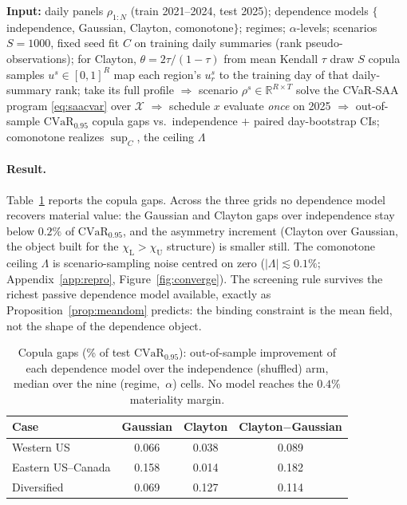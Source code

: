 \documentclass[10pt,twocolumn]{article}
\newcommand{\CVaR}{\mathrm{CVaR}}
\newcommand{\R}{\mathbb{R}}
\newcommand{\chiU}{\chi_{\mathrm{U}}}
\newcommand{\chiL}{\chi_{\mathrm{L}}}
\begin{document}
\begin{algorithm}[h]
\caption{Copula-scenario CVaR scheduling (one region set)}
\label{alg:copula}
\begin{algorithmic}[1]
\State \textbf{Input:} daily panels $\rho_{1:N}$ (train 2021--2024, test 2025);
dependence models $\{$independence, Gaussian, Clayton, comonotone$\}$; regimes;
$\alpha$-levels; scenarios $S=1000$, fixed seed
  \State fit $C$ on training daily summaries (rank pseudo-observations); for Clayton,
  $\theta=2\tau/(1-\tau)$ from mean Kendall $\tau$
    \State draw $S$ copula samples $u^s\in[0,1]^R$ 
    \State map each region's $u^s_r$ to the training day of that daily-summary rank;
    take its full profile $\Rightarrow$ scenario $\rho^s\in\R^{R\times T}$
    \State solve the CVaR-SAA program \eqref{eq:saacvar} over $\mathcal X$
    $\Rightarrow$ schedule $x$
    \State evaluate \emph{once} on 2025 $\Rightarrow$ out-of-sample $\CVaR_{0.95}$
  \EndFor
\EndFor
\State copula gaps vs.\ independence $+$ paired day-bootstrap CIs; comonotone
realizes $\sup_C$, the ceiling $\Lambda$
\end{algorithmic}
\end{algorithm}

\paragraph{Result.} Table~\ref{tab:copula} reports the copula gaps. Across the three
grids no dependence model recovers material value: the Gaussian and Clayton gaps over
independence stay below $0.2\%$ of $\CVaR_{0.95}$, and the asymmetry increment
(Clayton over Gaussian, the object built for the $\chiL>\chiU$ structure) is smaller
still. The comonotone ceiling $\Lambda$ is scenario-sampling noise centred on zero
($|\Lambda|\lesssim0.1\%$; Appendix~\ref{app:repro}, Figure~\ref{fig:converge}). The
screening rule survives the richest passive dependence model available, exactly as
Proposition~\ref{prop:meandom} predicts: the binding constraint is the mean field, not
the shape of the dependence object.

\begin{table}[h]
\centering\small
\caption{Copula gaps (\% of test $\CVaR_{0.95}$): out-of-sample improvement of each
dependence model over the independence (shuffled) arm, median over the nine
(regime,~$\alpha$) cells. No model reaches the $0.4\%$ materiality margin.}
\label{tab:copula}
\begin{tabular}{lccc}
\toprule
Case & Gaussian & Clayton & Clayton$-$Gaussian\\
\midrule
Western US        & 0.066 & 0.038 & 0.089\\
Eastern US--Canada & 0.158 & 0.014 & 0.182\\
Diversified       & 0.069 & 0.127 & 0.114\\
\bottomrule
\end{tabular}
\end{table}
\end{document}
